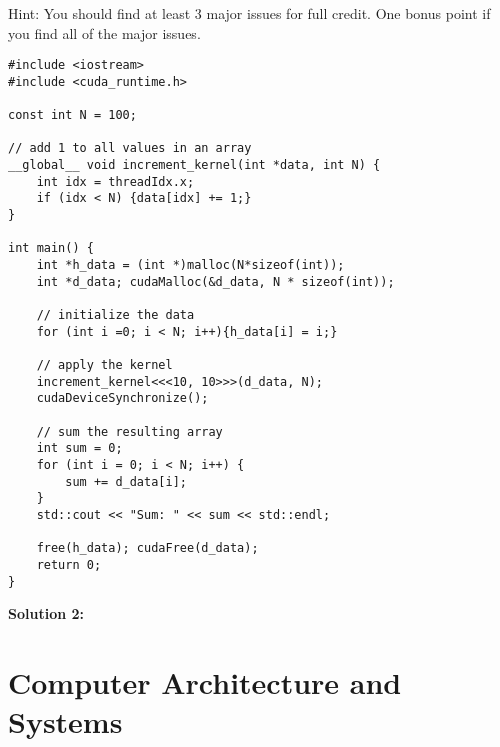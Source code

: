 \documentclass[]{article}
\begin{document}
Hint: You should find at least 3 major issues for full credit. One bonus point if you find all of the major issues.

\begin{lstlisting}
#include <iostream>
#include <cuda_runtime.h>

const int N = 100;

// add 1 to all values in an array
__global__ void increment_kernel(int *data, int N) {
    int idx = threadIdx.x;
    if (idx < N) {data[idx] += 1;}
}

int main() {
    int *h_data = (int *)malloc(N*sizeof(int));
    int *d_data; cudaMalloc(&d_data, N * sizeof(int));

    // initialize the data
    for (int i =0; i < N; i++){h_data[i] = i;}

    // apply the kernel
    increment_kernel<<<10, 10>>>(d_data, N);
    cudaDeviceSynchronize();

    // sum the resulting array
    int sum = 0;
    for (int i = 0; i < N; i++) {
        sum += d_data[i];
    }
    std::cout << "Sum: " << sum << std::endl;

    free(h_data); cudaFree(d_data);
    return 0;
}

\end{lstlisting}

\clearpage
\textbf{Solution 2:}


\clearpage
\section{Computer Architecture and Systems}
\end{document}
